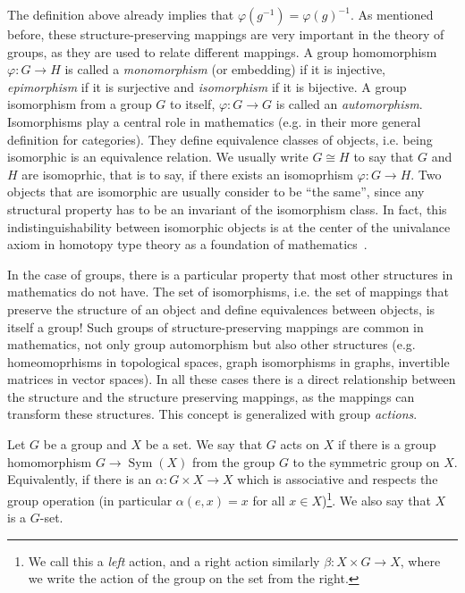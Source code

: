 The definition above already implies that $\varphi(g^{-1}) = \varphi(g)^{-1}$.
As mentioned before, these structure-preserving mappings are very important in the theory of groups, as they are used to relate different mappings. 
A group homomorphism $\varphi : G \rightarrow H$ is called a \emph{monomorphism} (or embedding) if it is injective, \emph{epimorphism} if it is surjective and \emph{isomorphism} if it is bijective.
A group isomorphism from a group $G$ to itself, $\varphi : G \rightarrow G$ is called an \emph{automorphism}.
Isomorphisms play a central role in mathematics (e.g. in their more general definition for categories).
They define equivalence classes of objects, i.e. being isomorphic is an equivalence relation. We usually write $G \cong H$ to say that $G$ and $H$ are isomoprhic, that is to say, if there exists an isomoprhism $\varphi: G \rightarrow H$.
Two objects that are isomorphic are usually consider to be ``the same'', since any structural property has to be an invariant of the isomorphism class. 
In fact, this indistinguishability between isomorphic objects is at the center of the univalance axiom in homotopy type theory as a foundation of mathematics~\cite{hott_book}.

In the case of groups, there is a particular property that most other structures in mathematics do not have.
The set of isomorphisms, i.e. the set of mappings that preserve the structure of an object and define equivalences between objects, is itself a group!
Such groups of structure-preserving mappings are common in mathematics, not only group automorphism but also other structures (e.g. homeomoprhisms in topological spaces, graph isomorphisms in graphs, invertible matrices in vector spaces).
In all these cases there is a direct relationship between the structure and the structure preserving mappings, as the mappings can transform these structures.
This concept is generalized with group \emph{actions}. 
\begin{defn}
    Let $G$ be a group and $X$ be a set.
We say that $G$ acts on $X$ if there is a group homomorphism $G \rightarrow \operatorname{Sym}(X)$ from the group $G$ to the symmetric group on $X$. 
Equivalently, if there is an $\alpha : G \times X \rightarrow X$ which is associative and respects the group operation (in particular $\alpha(e,x) = x$ for all $x \in X$)\footnote{We
call this a \emph{left} action, and a right action similarly $\beta  : X \times G \rightarrow X$, where we write the action of the group on the set from the right.}. 
We also say that $X$ is a $G$-set.
\end{defn}

